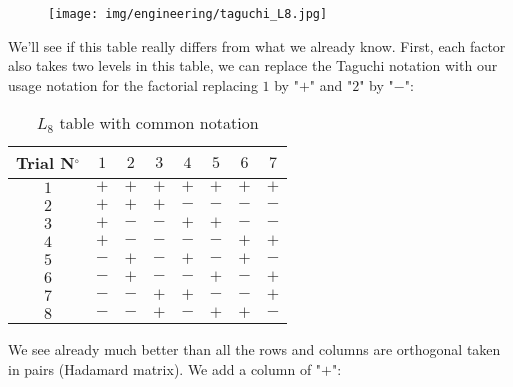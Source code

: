 	\begin{figure}[H]
		\begin{center}
		\texttt{[image: img/engineering/taguchi\_L8.jpg]}
		\end{center}	
	\end{figure}
	We'll see if this table really differs from what we already know. First, each factor also takes two levels in this table, we can replace the Taguchi notation with our usage notation for the factorial replacing $1$ by "$+$" and "$2$" by "$-$":
	\begin{table}[H]\centering
	\begin{center}
			\begin{tabular}{|c|c|c|c|c|c|c|c|}
				\hline
				\multicolumn{1}{c}{\cellcolor{black!30}\textbf{Trial N${}^\circ$}} & 
  \multicolumn{1}{c}{\cellcolor{black!30}$1$} & 
  \multicolumn{1}{c}{\cellcolor{black!30}$2$} & 
  \multicolumn{1}{c}{\cellcolor{black!30}$3$} & 
  \multicolumn{1}{c}{\cellcolor{black!30}$4$} & 
  \multicolumn{1}{c}{\cellcolor{black!30}$5$} & 
  \multicolumn{1}{c}{\cellcolor{black!30}$6$} & 
  \multicolumn{1}{c}{\cellcolor{black!30}$7$}\\ \hline
				$1$ & $+$ & $+$ & $+$ & $+$ & $+$ & $+$ & $+$\\ \hline
				$2$ & $+$ & $+$ & $+$ & $-$ & $-$ & $-$ & $-$\\ \hline
				$3$ & $+$ & $-$ & $-$ & $+$ & $+$ & $-$ & $-$\\ \hline
				$4$ & $+$ & $-$ & $-$ & $-$ & $-$ & $+$ & $+$\\ \hline
				$5$ & $-$ & $+$ & $-$ & $+$ & $-$ & $+$ & $-$\\ \hline
				$6$ & $-$ & $+$ & $-$ & $-$ & $+$ & $-$ & $+$\\ \hline
				$7$ & $-$ & $-$ & $+$ & $+$ & $-$ & $-$ & $+$\\ \hline
				$8$ & $-$ & $-$ & $+$ & $-$ & $+$ & $+$ & $-$\\ \hline
 		\end{tabular}
	\end{center}
	\caption{$L_8$ table with common notation}
	\end{table}
	We see already much better than all the rows and columns are orthogonal taken in pairs (Hadamard matrix). We add a column of "$+$":
